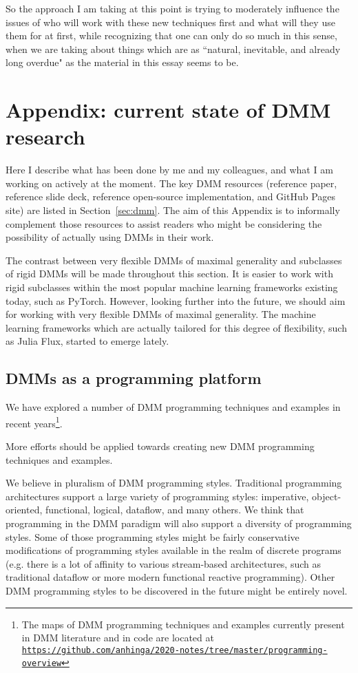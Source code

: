 \documentclass{article}
\begin{document}
So the approach I am taking at this point is trying to moderately influence the issues of
who will work with these new techniques first and what will they use them for at first, while recognizing that
one can only do so much in this sense, when we are taking about things which are as
``natural, inevitable, and already long overdue" as the material in this essay seems to be.



\appendix

\section{Appendix: current state of DMM research}

Here I describe what has been done by me and my colleagues, and what I am working on actively at the moment.  The key DMM resources (reference paper, reference slide
deck, reference open-source implementation, and GitHub Pages site) are listed in Section~\ref{sec:dmm}. The aim of this Appendix
is to informally complement those resources to assist readers who might be considering the possibility of actually
using DMMs in their work.

The contrast between very flexible DMMs of maximal generality and subclasses of rigid DMMs will be made throughout this section. It is easier to work with rigid subclasses within the most popular machine learning frameworks existing today, such as PyTorch. However, looking further into the future, we should aim for working with very flexible DMMs of maximal generality.
The machine learning frameworks which are actually tailored for this degree of flexibility, such as Julia Flux, started to emerge lately.

\subsection{DMMs as a programming platform}

We have explored a number of DMM programming techniques and examples in recent years\footnote{The maps of
DMM programming techniques and examples currently present in DMM literature and in code are located at
\href{https://github.com/anhinga/2020-notes/tree/master/programming-overview}{\tt https://github.com/anhinga/2020-notes/tree/master/programming-overview}}.

More efforts should be applied towards creating new DMM programming techniques and examples.

We believe in pluralism of DMM programming styles. 
Traditional programming architectures support a large variety of programming styles: imperative, object-oriented, functional, logical, dataflow, and many others. We think that programming in the DMM paradigm will also support a diversity of programming styles. Some of those programming styles might be fairly conservative modifications of programming styles available in the realm of discrete programs (e.g. there is a lot of affinity to various stream-based architectures, such
as traditional dataflow or more modern functional reactive programming).
Other DMM programming styles to be discovered in the future might be entirely novel. 
\end{document}
